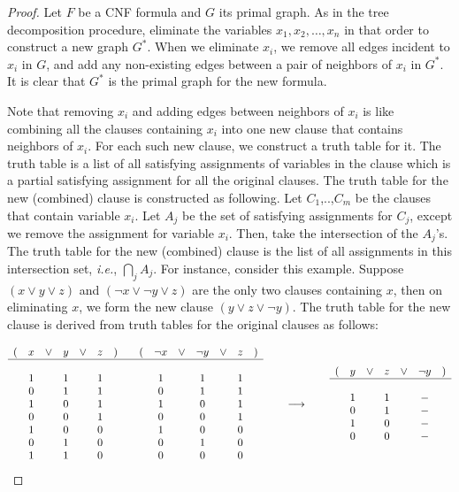 \documentclass{article}
\begin{document}
\begin{proof}
Let $F$ be a CNF formula and $G$ its primal graph. As in the tree
decomposition procedure, eliminate the variables
$x_1,x_2,\ldots,x_n$ in that order to construct a new graph $G^*$.
When we eliminate $x_i$, we remove all edges incident to $x_i$ in
$G$, and add any non-existing edges between a pair of neighbors of
$x_i$ in $G^*$. It is clear that $G^*$ is the
primal graph for the new formula.



Note that removing $x_i$ and adding edges between neighbors of $x_i$ is like combining all the clauses containing $x_i$ into one new clause that contains neighbors of $x_i$. 
For each such new clause, we construct a truth table for it. The truth table is a list of all satisfying assignments of variables in the clause which is a partial
satisfying assignment for all the original clauses. The truth table for the new (combined) clause is constructed as following. Let $C_1$,..,$C_m$ be the clauses that contain variable $x_i$. Let $A_j$ be the set of satisfying assignments for $C_j$, except we remove the assignment for variable $x_i$. Then, take the intersection of the $A_j$'s. The truth table for the new (combined) clause is the list of all assignments in this intersection set, \emph{i.e.}, $\bigcap_{j} A_j$. For instance, consider this example. Suppose $(x\vee y\vee z)$ and $(\neg x\vee\neg y\vee z)$ are the only
two clauses containing $x$, then on eliminating $x$, we form the
new clause $(y\vee z\vee\neg y)$. The truth table for the new
clause is derived from truth tables for the original clauses as
follows:

$$\begin{array}{cccccccccccccccc}
  ( & x & \vee & y & \vee & z & ) && ( & \neg x & \vee & \neg y
  & \vee & z & )\\\hline\\
  &1&&1&&1&&&&1&&1&&1\\
  &0&&1&&1&&&&0&&1&&1\\
  &1&&0&&1&&&&1&&0&&1\\
  &0&&0&&1&&&&0&&0&&1\\
  &1&&0&&0&&&&1&&0&&0\\
  &0&&1&&0&&&&0&&1&&0\\
  &1&&1&&0&&&&0&&0&&0\\
\end{array}\qquad\longrightarrow\qquad
\begin{array}{ccccccc}
  ( & y & \vee & z & \vee & \neg y & )\\\hline\\
  &1&&1&&-\\
  &0&&1&&-\\
  &1&&0&&-\\
  &0&&0&&-\\
\end{array}$$


\end{proof}
\end{document}
